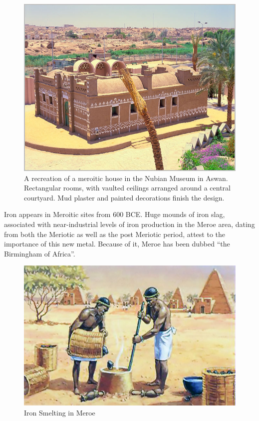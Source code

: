 \documentclass[a4paper,12pt]{scrreprt}
\begin{document}
\begin{figure}[H]
	\centering
	\includegraphics[width=\textwidth]{img/house/recreation_nubian_architecture}
	\caption{A recreation of a meroitic house in the Nubian Museum in Aswan. Rectangular rooms, with vaulted ceilings arranged around a central courtyard. Mud plaster and painted decorations finish the design.}
\end{figure}

Iron appears in Meroitic sites from 600 BCE. Huge mounds of iron slag, associated with near-industrial levels of iron production in the Meroe area, dating from both the Meriotic as well as the post Meriotic period, attest to the importance of this new metal. Because of it, Meroe has been dubbed “the Birmingham of Africa”.

\begin{figure}[H]
	\centering
	\includegraphics[width=\textwidth]{img/iron_smelting}
	\caption{Iron Smelting in Meroe}
\end{figure}
\end{document}
